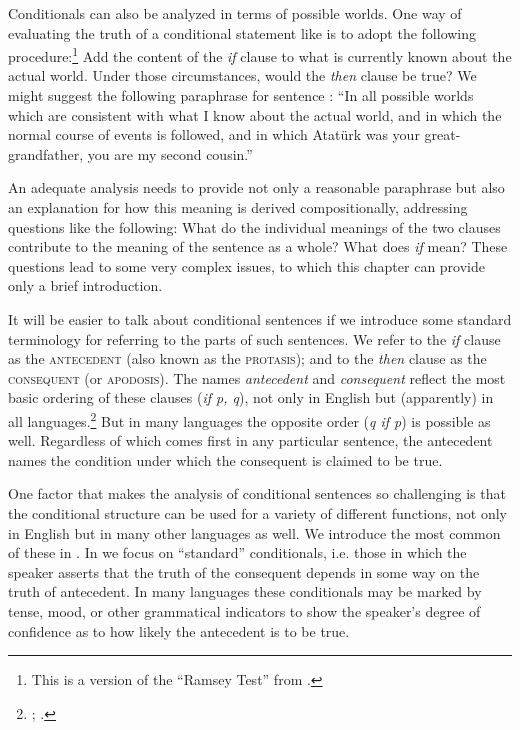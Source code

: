 Conditionals can also be analyzed in terms of possible worlds. One way of evaluating the truth of a conditional statement like  is to adopt the following procedure:\footnote{This is a version of the “Ramsey Test” from \citet{Stalnaker1968}.} Add the content of the \textit{if} clause to what is currently known about the actual world. Under those circumstances, would the \textit{then} clause be true? We might suggest the following paraphrase for sentence : “In all possible worlds which are consistent with what I know about the actual world, and in which the normal course of events is followed, and in which Atatürk was your great-grandfather, you are my second cousin.”



An adequate analysis needs to provide not only a reasonable paraphrase but also an explanation for how this meaning is derived compositionally, addressing questions like the following: What do the individual meanings of the two clauses contribute to the meaning of the sentence as a whole? What does \textit{if} mean? These questions lead to some very complex issues, to which this chapter can provide only a brief introduction.



It will be easier to talk about conditional sentences if we introduce some standard terminology for referring to the parts of such sentences. We refer to the \textit{if} clause as the \textsc{antecedent} (also known as the \textsc{protasis}); and to the \textit{then} clause as the \textsc{consequent} (or \textsc{apodosis}). The names \textit{antecedent} and \textit{consequent} reflect the most basic ordering of these clauses (\textit{if p, q}), not only in English but (apparently) in all languages.\footnote{\citet[84--85]{Greenberg1963}; \citet[83]{Comrie1986}.} But in many languages the opposite order (\textit{q if p}) is possible as well. Regardless of which comes first in any particular sentence, the antecedent names the condition under which the consequent is claimed to be true.



One factor that makes the analysis of conditional sentences so challenging is that the conditional structure can be used for a variety of different functions, not only in English but in many other languages as well. We introduce the most common of these in . In  we focus on “standard” conditionals, i.e. those in which the speaker asserts that the truth of the consequent depends in some way on the truth of antecedent. In many languages these conditionals may be marked by tense, mood, or other grammatical indicators to show the speaker’s degree of confidence as to how likely the antecedent is to be true.



